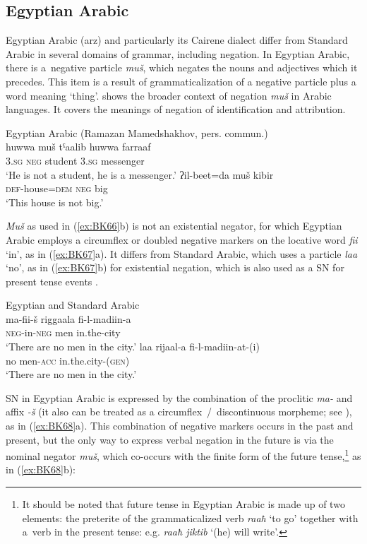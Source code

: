 \documentclass[output=paper,draft,draftmode,colorlinks,citecolor=brown]{langscibook}
\begin{document}
\subsection{Egyptian Arabic}\label{sec:BK4.3}

Egyptian Arabic (arz) and particularly its Cairene dialect differ from Standard Arabic in several domains of grammar, including negation. In Egyptian Arabic, there is a negative particle \textit{muš}, which negates the nouns and adjectives which it precedes. This item is a result of grammaticalization of a negative particle plus a word meaning ‘thing’. \citet{wilmsen-a} shows the broader context of negation \textit{muš} in Arabic languages. It covers the meanings of negation of identification and attribution.

\ea Egyptian Arabic (Ramazan Mamedshakhov, pers. commun.) \label{ex:BK66}\\
  \ea
	\gll huwwa	muš	tˤaalib	huwwa	farraaf\\
	\textsc{3.sg}		\textsc{neg}	student	\textsc{3.sg}		messenger\\
	\glt `He is not a student, he is a messenger.'
  \ex
	\gll ʔil-beet=da			muš	kibir\\
	\textsc{def}-house=\textsc{dem}	\textsc{neg}	big\\
	\glt `This house is not big.'
\z \z

\textit{Muš} as used in (\ref{ex:BK66}b) is not an existential negator, for which Egyptian Arabic employs a circumflex or doubled negative markers on the locative word \textit{fii} ‘in’, as in (\ref{ex:BK67}a). It differs from Standard Arabic, which uses a particle \textit{laa} ‘no’, as in (\ref{ex:BK67}b) for existential negation, which is also used as a SN for present tense events \citep[232]{gadalla2000a}.

\ea Egyptian and Standard Arabic \citep[234]{gadalla2000a} \label{ex:BK67}\\
  \ea
	\gll ma-fii-š		riggaala		fi-l-madiin-a\\
	\textsc{neg}-in-\textsc{neg}	men			in.the-city\\
	\glt `There are no men in the city.'
  \ex
	\gll laa	rijaal-a		fi-l-madiin-at-(i)\\
	no		men-\textsc{acc}	in.the.city-(\textsc{gen})\\
	\glt `There are no men in the city.'
\z \z

SN in Egyptian Arabic is expressed by the combination of the proclitic \textit{ma-} and affix \textit{-š} (it also can be treated as a circumflex / discontinuous morpheme; see \citealp[234]{gadalla2000a}), as in (\ref{ex:BK68}a). This combination of negative markers occurs in the past and present, but the only way to express verbal negation in the future is via the nominal negator \textit{muš}, which co-occurs with the finite form of the future tense,\footnote{It should be noted that future tense in Egyptian Arabic is made up of two elements: the preterite of the grammaticalized verb \textit{raaħ} ‘to go’ together with a verb in the present tense: e.g. \textit{raaħ jiktib} ‘(he) will write’.} as in (\ref{ex:BK68}b):
\end{document}
